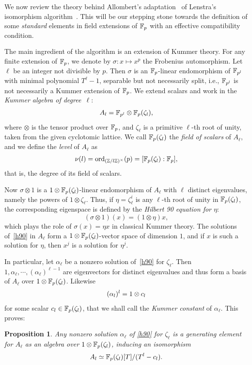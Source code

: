 \documentclass[sigconf]{acmart}
\newtheorem{proposition}[theorem]{Proposition}
\begin{document}
We now review the theory behind Allombert's
adaptation~\cite{Allombert02} of Lenstra's isomorphism
algorithm~\cite{LenstraJr91}. %
This will be our stepping stone towards the definition of some
\emph{standard} elements in field extensions of $\mathbb{F}_p$ with an
effective compatibility condition.

The main ingredient of the algorithm is an extension
of Kummer theory.
For any finite extension of $\mathbb{F}_{p}$, we denote by $ \sigma:x\mapsto x^p $
the Frobenius automorphism.
Let $\ell$ be an integer not divisible by $p$.
Then $\sigma$ is an $\mathbb{F}_{p}$-linear endomorphism of $\mathbb{F}_{p^l}$
with minimal polynomial $T^\ell-1$, separable but not necessarily split,
i.e., $\mathbb{F}_{p^l}$ is not necessarily a Kummer extension of $\mathbb{F}_{p}$.
We extend scalars and work in the
\emph{Kummer algebra of degree~$\ell$}:
\[
  A_l = \mathbb{F}_{p^l}\otimes\mathbb{F}_{p}(\zeta_l),
\]
where $\otimes$ is the tensor product over $\mathbb{F}_{p}$, and $\zeta_\ell$ is a primitive
$\ell$-th root of unity, taken from the given cyclotomic lattice. We
call $\mathbb{F}_{p}(\zeta_l)$ the \emph{field of scalars} of $A_\ell$, and
we define the \emph{level} of $A_\ell$ as
\[
  \nu(l) = \mathrm{ord}_{(\mathbb{Z}/l\mathbb{Z})^\times}(p) = [\mathbb{F}_{p}(\zeta_l):\mathbb{F}_{p}],
\]
that is, the degree of its field of scalars.

Now $\sigma\otimes1$ is a $1\otimes\mathbb{F}_{p}(\zeta_l)$-linear endomorphism of $A_\ell$
with $\ell$ distinct eigenvalues, namely the powers of $1\otimes\zeta_\ell$.
Thus, if $\eta=\zeta_\ell^i$ is any $\ell$-th root of unity in $\mathbb{F}_{p}(\zeta_l)$,
the corresponding eigenspace is defined by the \emph{Hilbert 90 equation for $\eta$}:
\begin{equation}
  \tag{H90}
 (\sigma\otimes1)(x) = (1\otimes\eta)x,
  \label{h90}
\end{equation}
which plays the role of $\sigma(x)=\eta x$ in classical Kummer theory.
The solutions of~\eqref{h90} in $A_\ell$ form a
$1\otimes\mathbb{F}_{p}(\zeta_{l})$-vector space of dimension $1$,
and if $x$ is such a solution for $\eta$, then $x^j$ is a solution for $\eta^j$.

In particular, let $\alpha_\ell$ be a nonzero solution of~\eqref{h90} for $\zeta_\ell$.
Then $1,\alpha_\ell,\cdots,(\alpha_\ell)^{\ell-1}$ are eigenvectors for distinct eigenvalues and thus
form a basis of $A_\ell$ over $1\otimes\mathbb{F}_{p}(\zeta_{l})$.
Likewise
\[ (\alpha_l)^l = 1\otimes c_l \]
for some scalar $c_l\in\mathbb{F}_{p}(\zeta_l)$,
that we shall call the \emph{Kummer constant} of $\alpha_\ell$.
This proves:
\begin{proposition}
\label{alphagen}
Any nonzero solution $\alpha_\ell$ of \eqref{h90} for $\zeta_\ell$ is a generating element for $A_\ell$ as an algebra over $1\otimes\mathbb{F}_{p}(\zeta_{l})$,
inducing an isomorphism
\[ A_l\simeq \mathbb{F}_{p}(\zeta_{l})[T]/(T^l-c_l). \]
\end{proposition}
\end{document}
